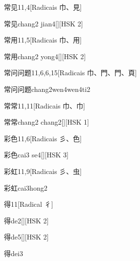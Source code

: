 \begin{entry}{常见}{11,4}[Radicais ⼱、⾒]
  \begin{phonetics}{常见}{chang2 jian4}[][HSK 2]
  \end{phonetics}
\end{entry}

\begin{entry}{常用}{11,5}[Radicais ⼱、⽤]
  \begin{phonetics}{常用}{chang2 yong4}[][HSK 2]
  \end{phonetics}
\end{entry}

\begin{entry}{常问问题}{11,6,6,15}[Radicais ⼱、⾨、⾨、⾴]
  \begin{phonetics}{常问问题}{chang2wen4wen4ti2}
  \end{phonetics}
\end{entry}

\begin{entry}{常常}{11,11}[Radicais ⼱、⼱]
  \begin{phonetics}{常常}{chang2 chang2}[][HSK 1]
  \end{phonetics}
\end{entry}

\begin{entry}{彩色}{11,6}[Radicais ⼺、⾊]
  \begin{phonetics}{彩色}{cai3 se4}[][HSK 3]
  \end{phonetics}
\end{entry}

\begin{entry}{彩虹}{11,9}[Radicais ⼺、⾍]
  \begin{phonetics}{彩虹}{cai3hong2}
  \end{phonetics}
\end{entry}

\begin{entry}{得}{11}[Radical ⼻]
  \begin{phonetics}{得}{de2}[][HSK 2]
  \end{phonetics}
  \begin{phonetics}{得}{de5}[][HSK 2]
  \end{phonetics}
  \begin{phonetics}{得}{dei3}
  \end{phonetics}
\end{entry}


